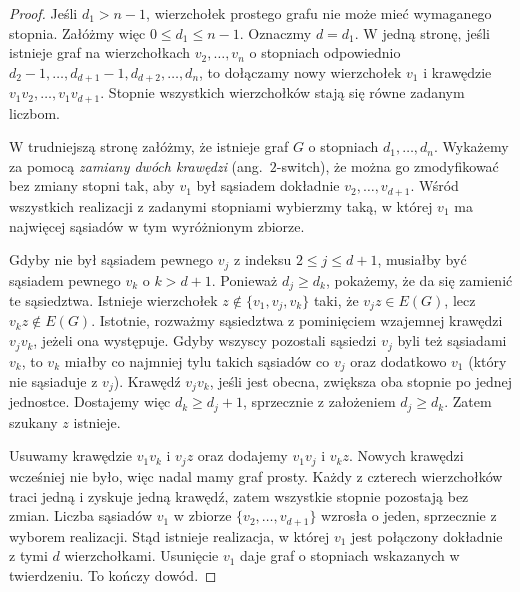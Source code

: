 \begin{proof}
Jeśli $d_1>n-1$, wierzchołek prostego grafu
nie może mieć wymaganego stopnia. Załóżmy więc
$0\le d_1\le n-1$. Oznaczmy $d=d_1$.
W jedną stronę, jeśli istnieje graf na wierzchołkach
$v_2,\ldots,v_n$ o stopniach odpowiednio
$d_2-1,\ldots,d_{d+1}-1,d_{d+2},\ldots,d_n$,
to dołączamy nowy wierzchołek $v_1$ i krawędzie
$v_1v_2,\ldots,v_1v_{d+1}$. Stopnie wszystkich
wierzchołków stają się równe zadanym liczbom.

W trudniejszą stronę załóżmy, że istnieje graf $G$
o stopniach $d_1,\ldots,d_n$. Wykażemy za pomocą
\emph{zamiany dwóch krawędzi} (ang.\ $2$-switch), że
można go zmodyfikować bez zmiany stopni tak,
aby $v_1$ był sąsiadem dokładnie $v_2,\ldots,v_{d+1}$.
Wśród wszystkich realizacji z zadanymi stopniami
wybierzmy taką, w której $v_1$ ma najwięcej
sąsiadów w tym wyróżnionym zbiorze.

Gdyby nie był sąsiadem pewnego $v_j$ z indeksu
$2\le j\le d+1$, musiałby być sąsiadem pewnego
$v_k$ o $k>d+1$. Ponieważ $d_j\ge d_k$, pokażemy,
że da się zamienić te sąsiedztwa. Istnieje
wierzchołek $z\notin\{v_1,v_j,v_k\}$ taki,
że $v_jz\in E(G)$, lecz $v_kz\notin E(G)$.
Istotnie, rozważmy sąsiedztwa z pominięciem
wzajemnej krawędzi $v_jv_k$, jeżeli ona występuje.
Gdyby wszyscy pozostali sąsiedzi $v_j$ byli też
sąsiadami $v_k$, to $v_k$ miałby co najmniej
tylu takich sąsiadów co $v_j$ oraz dodatkowo
$v_1$ (który nie sąsiaduje z $v_j$).
Krawędź $v_jv_k$, jeśli jest obecna, zwiększa oba
stopnie po jednej jednostce. Dostajemy więc
$d_k\ge d_j+1$, sprzecznie z założeniem
$d_j\ge d_k$. Zatem szukany $z$ istnieje.

Usuwamy krawędzie $v_1v_k$ i $v_jz$ oraz
dodajemy $v_1v_j$ i $v_kz$. Nowych krawędzi
wcześniej nie było, więc nadal mamy graf prosty.
Każdy z czterech wierzchołków traci jedną i zyskuje
jedną krawędź, zatem wszystkie stopnie pozostają
bez zmian. Liczba sąsiadów $v_1$ w zbiorze
$\{v_2,\ldots,v_{d+1}\}$ wzrosła o jeden,
sprzecznie z wyborem realizacji. Stąd istnieje
realizacja, w której $v_1$ jest połączony
dokładnie z tymi $d$ wierzchołkami.
Usunięcie $v_1$ daje graf o stopniach wskazanych
w twierdzeniu. To kończy dowód.
\end{proof}

